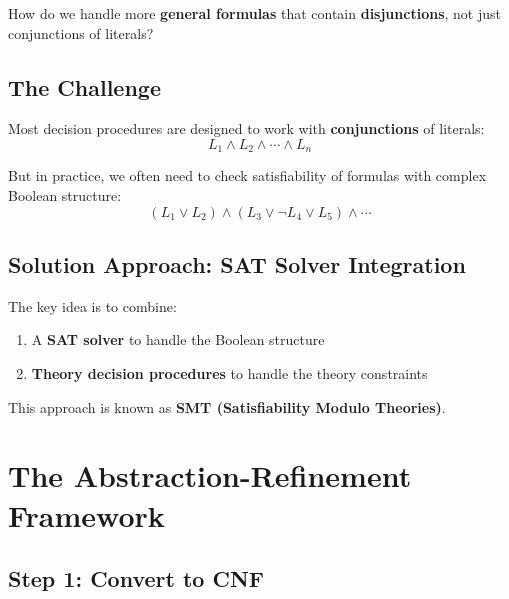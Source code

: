 \documentclass[11pt,a4paper]{article}
\theoremstyle{definition}
\theoremstyle{plain}
\theoremstyle{remark}
\begin{document}
\begin{tcolorbox}[colback=yellow!10!white,colframe=orange!75!black,title=\textbf{Key Question}]

How do we handle more \textbf{general formulas} that contain \textbf{disjunctions}, not just conjunctions of literals?

\end{tcolorbox}



\subsection{The Challenge}



Most decision procedures are designed to work with \textbf{conjunctions} of literals:
\[
L_1 \wedge L_2 \wedge \cdots \wedge L_n
\]



But in practice, we often need to check satisfiability of formulas with complex Boolean structure:
\[
(L_1 \vee L_2) \wedge (L_3 \vee \neg L_4 \vee L_5) \wedge \cdots
\]



\subsection{Solution Approach: SAT Solver Integration}



The key idea is to combine:

\begin{enumerate}

    \item A \textbf{SAT solver} to handle the Boolean structure

    \item \textbf{Theory decision procedures} to handle the theory constraints

\end{enumerate}



This approach is known as \textbf{SMT (Satisfiability Modulo Theories)}.



\section{The Abstraction-Refinement Framework}



\subsection{Step 1: Convert to CNF}
\end{document}
